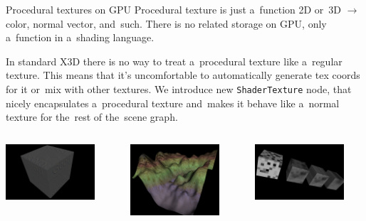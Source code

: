 \documentclass{beamer}
\begin{document}
\begin{frame}[fragile]{Procedural textures on GPU}
Procedural texture is just a~function 2D or~3D $\rightarrow$
color, normal vector, and~such.
There is no related storage on GPU, only a~function
in a~shading language.

\vspace{0.1in}

In standard X3D there is no way to treat a~procedural texture
like a~regular texture. This means that it's uncomfortable
to automatically generate tex coords for it or~mix with other textures.
We introduce new \texttt{ShaderTexture} node, that nicely
encapsulates a~procedural texture and~makes it behave like a~normal texture
for the~rest of the~scene graph.

\begin{center}
\begin{columns}[T]
  \begin{column}{1in}
    \includegraphics[width=1.3in]{../shader_texture_edge_detection}
  \end{column}
  \begin{column}{1in}
    \includegraphics[width=1.3in]{../terrain}
  \end{column}
  \begin{column}{1in}
    \includegraphics[width=1.3in]{../noise}
  \end{column}
\end{columns}
\end{center}

\end{frame}
\end{document}
